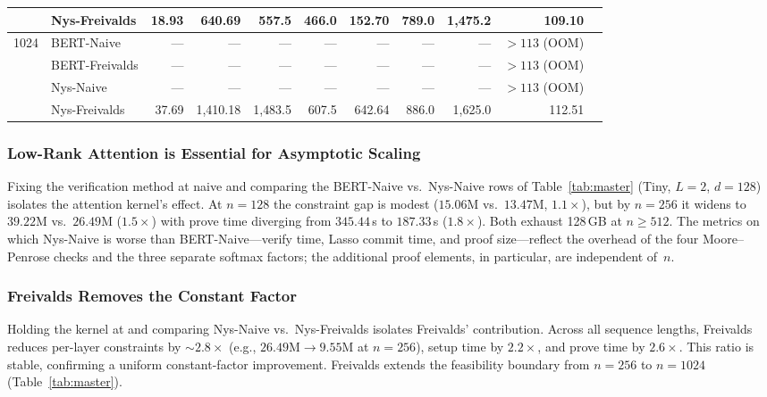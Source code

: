 \documentclass[runningheads]{llncs}
\begin{document}
\begin{table}[!ht]
{\begin{tabular}{@{} cl rrrrrrrrr @{}}
  & Nys-Freivalds  & 18.93 & 640.69 & 557.5 & 466.0 & 152.70 & 789.0 & 1{,}475.2  & 109.10 \\
\midrule
\multirow{4}{*}{1024}
  & BERT-Naive     & ---   & ---    & ---   & ---   & ---    & ---   & ---        & ${>}113$ (OOM) \\
  & BERT-Freivalds & ---   & ---    & ---   & ---   & ---    & ---   & ---        & ${>}113$ (OOM) \\
  & Nys-Naive      & ---   & ---    & ---   & ---   & ---    & ---   & ---        & ${>}113$ (OOM) \\
  & Nys-Freivalds  & 37.69 & 1{,}410.18 & 1{,}483.5 & 607.5 & 642.64 & 886.0 & 1{,}625.0  & 112.51 \\
\bottomrule
\end{tabular}%
}
\end{table}

\subsubsection{Low-Rank Attention is Essential for Asymptotic Scaling}
\label{subsec:lowrank-essential}
Fixing the verification method at naive and comparing the BERT-Naive vs.\ Nys-Naive rows of Table~\ref{tab:master} (Tiny, $L{=}2$, $d{=}128$) isolates the attention kernel's effect. At $n{=}128$ the constraint gap is modest ($15.06$M vs.\ $13.47$M, $1.1{\times}$), but by $n{=}256$ it widens to $39.22$M vs.\ $26.49$M ($1.5{\times}$) with prove time diverging from $345.44$\,s to $187.33$\,s ($1.8{\times}$). Both exhaust 128\,GB at $n{\geq}512$. The metrics on which Nys-Naive is worse than BERT-Naive---verify time, Lasso commit time, and proof size---reflect the overhead of the four Moore--Penrose checks and the three separate softmax factors; the additional proof elements, in particular, are independent of~$n$.

\subsubsection{Freivalds Removes the Constant Factor}
\label{subsec:freivalds-benefit}
Holding the kernel at \nystrom and comparing Nys-Naive vs.\ Nys-Freivalds isolates Freivalds' contribution. Across all sequence lengths, Freivalds reduces per-layer constraints by ${\sim}2.8{\times}$ (e.g., $26.49$M$\to$$9.55$M at $n{=}256$), setup time by $2.2{\times}$, and prove time by $2.6{\times}$. This ratio is stable, confirming a uniform constant-factor improvement. Freivalds extends the feasibility boundary from $n{=}256$ to $n{=}1024$ (Table~\ref{tab:master}).
\end{document}
